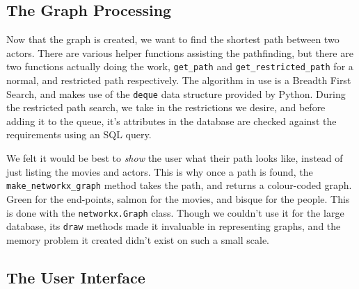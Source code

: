 \documentclass{article}
\begin{document}
\subsection{The Graph Processing}

Now that the graph is created, we want to find the shortest path between two actors. There are various helper functions assisting the pathfinding, but there are two functions actually doing the work, \verb+get_path+ and \verb+get_restricted_path+ for a normal, and restricted path respectively. The algorithm in use is a Breadth First Search, and makes use of the \verb+deque+ data structure provided by Python. During the restricted path search, we take in the restrictions we desire, and before adding it to the queue, it's attributes in the database are checked against the requirements using an SQL query.

We felt it would be best to \emph{show} the user what their path looks like, instead of just listing the movies and actors. This is why once a path is found, the \verb!make_networkx_graph! method takes the path, and returns a colour-coded graph. Green for the end-points, salmon for the movies, and bisque for the people. This is done with the \verb+networkx.Graph+ class. Though we couldn't use it for the large database, its \verb!draw! methods made it invaluable in representing graphs, and the memory problem it created didn't exist on such a small scale.  

\subsection{The User Interface}
\end{document}
